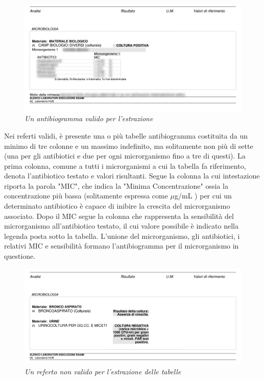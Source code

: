 \begin{figure}[h!]
	\centering
	\includegraphics[width=.99\columnwidth]{images/content.png}
	\caption{\textit{Un antibiogramma valido per l'estrazione}}
	\label{fig:content}
\end{figure}
\bigskip
Nei referti validi, è presente una o più tabelle antibiogramma costituita da un minimo di tre colonne e un massimo indefinito, ma solitamente non più di sette (una per gli antibiotici e due per ogni microrganismo fino a tre di questi).
La prima colonna, comune a tutti i microrganismi a cui la tabella fa riferimento, denota l'antibiotico testato e valori risultanti.
Segue la colonna la cui intestazione riporta la parola "MIC", che indica la "Minima Concentrazione" ossia la concentrazione più bassa (solitamente espressa come $\mu$g/mL ) per cui un determinato antibiotico è capace di inibire la crescita del microrganismo associato.
Dopo il MIC segue la colonna che rappresenta la sensibilità del microrganismo all'antibiotico testato, il cui valore possibile è indicato nella legenda posta sotto la tabella.
L'unione del microrganismo, gli antibiotici, i relativi MIC e sensibilità formano l'antibiogramma per il microrganismo in questione.

\begin{figure}[h!]
	\centering
	\includegraphics[width=.99\columnwidth]{images/content_senza.png}
	\caption{\textit{Un referto non valido per l'estrazione delle tabelle}}
	\label{fig:content_senza}
\end{figure}


